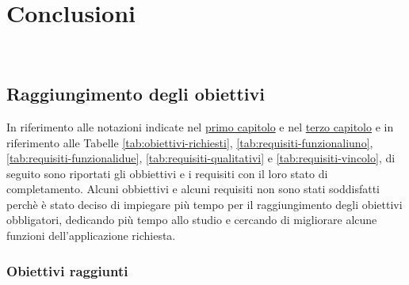 \chapter{Conclusioni}
\label{cap:conclusioni}

\\ 

\section{Raggiungimento degli obiettivi}
In riferimento alle notazioni indicate nel \hyperref[sec:obbiettivi]{primo capitolo} e nel \hyperref[sec:requisiti]{terzo capitolo} e in riferimento alle Tabelle \ref{tab:obiettivi-richiesti}, \ref{tab:requisiti-funzionaliuno}, \ref{tab:requisiti-funzionalidue}, \ref{tab:requisiti-qualitativi} e \ref{tab:requisiti-vincolo}, di seguito sono riportati gli obbiettivi e i requisiti con il loro stato di completamento.\newline
Alcuni obbiettivi e alcuni requisiti non sono stati soddisfatti perchè è stato deciso di impiegare più tempo per il raggiungimento degli obiettivi obbligatori, dedicando più tempo allo studio e cercando di migliorare alcune funzioni dell'applicazione richiesta.\newline

\subsection{Obiettivi raggiunti}

